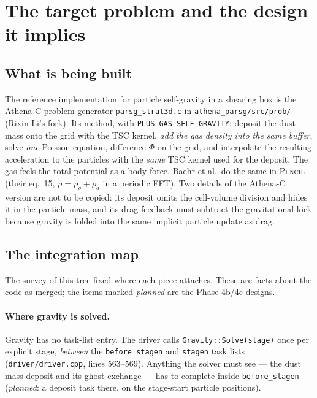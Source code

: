\documentclass[11pt]{article}
\newcommand{\code}[1]{\texttt{#1}}
\newcommand{\file}[1]{\texttt{\small #1}}
\newcommand{\fn}[1]{\texttt{\small #1}}
\begin{document}
\section{The target problem and the design it implies}
\label{sec:design}

\subsection{What is being built}

The reference implementation for particle self-gravity in a shearing box is the
Athena-C problem generator \file{parsg\_strat3d.c} in \file{athena\_parsg/src/prob/}
(Rixin Li's fork). Its method, with \code{PLUS\_GAS\_SELF\_GRAVITY}: deposit the dust mass onto the grid with
the TSC kernel, \emph{add the gas density into the same buffer}, solve \emph{one}
Poisson equation, difference $\Phi$ on the grid, and interpolate the resulting
acceleration to the particles with the \emph{same} TSC kernel used for the deposit.
The gas feels the total potential as a body force. Baehr et al.\ do the same in
\textsc{Pencil} (their eq.~15, $\rho = \rho_g + \rho_d$ in a periodic FFT). Two
details of the Athena-C version are not to be copied: its deposit omits the
cell-volume division and hides it in the particle mass, and its drag feedback must
subtract the gravitational kick because gravity is folded into the same implicit
particle update as drag.

\subsection{The integration map}
\label{sec:map}

The survey of this tree fixed where each piece attaches. These are facts about the
code as merged; the items marked \emph{planned} are the Phase 4b/4c designs.

\paragraph{Where gravity is solved.} Gravity has no task-list entry. The driver
calls \fn{Gravity::Solve(stage)} once per explicit stage, \emph{between} the
\code{before\_stagen} and \code{stagen} task lists
(\file{driver/driver.cpp}, lines 563--569). Anything the solver must see --- the dust mass
deposit and its ghost exchange --- has to complete inside \code{before\_stagen}
(\emph{planned}: a deposit task there, on the stage-start particle positions).
\end{document}
